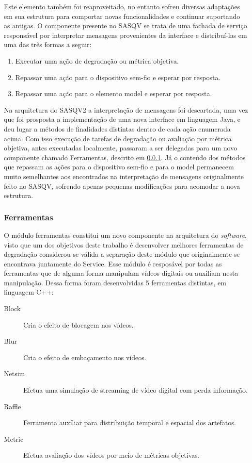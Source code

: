 Este elemento também foi reaproveitado, no entanto sofreu diversas adaptações em sua estrutura para comportar novas funcionalidades e continuar suportando as antigas.
O componente presente no SASQV se trata de uma fachada de serviço responsável por interpretar mensagens provenientes da interface e distribuí-las em uma das três formas a seguir:

\begin{enumerate}
	\item Executar uma ação de degradação ou métrica objetiva.
	\item Repassar uma ação para o dispositivo sem-fio e esperar por resposta.
	\item Repassar uma ação para o elemento model e esperar por resposta.
\end{enumerate}

Na arquitetura do SASQV2 a interpretação de mensagens foi descartada, uma vez que foi prosposta a implementação de uma nova interface em linguagem Java, e deu lugar a métodos de finalidades distintas dentro de cada ação enumerada acima. %
Com isso execução de tarefas de degradação ou avaliação por métrica objetiva, antes executadas localmente, passaram a ser delegadas para um novo componente chamado Ferramentas, descrito em \ref{met:ferramentas}.
Já o conteúdo dos métodos que repassam as ações para o dispositivo sem-fio e para o model permanecem muito semelhantes aos encontrados na interpretação de mensagens originalmente feito no SASQV, sofrendo apenas pequenas modificações para acomodar a nova estrutura.

\subsubsection{Ferramentas}
\label{met:ferramentas}

O módulo ferramentas constitui um novo componente na arquitetura do \emph{software}, visto que um dos objetivos deste trabalho é desenvolver melhores ferramentas de degradação considerou-se válida a separação deste módulo que originalmente se encontrava juntamente do Service.
Esse módulo é resposável por todas as ferramentas que de alguma forma manipulam vídeos digitais ou auxilíam nesta manipulação. Dessa forma foram desenvolvidas 5 ferramentas distintas, em linguagem C++:

\begin{description}
	\item[Block] Cria o efeito de blocagem nos vídeos.
	\item[Blur] Cria o efeito de embaçamento nos vídeos.
	\item[Netsim] Efetua uma simulação de streaming de vídeo digital com perda informação.
	\item[Raffle] Ferramenta auxíliar para distribuição temporal e espacial dos artefatos.
	\item[Metric] Efetua avaliação dos vídeos por meio de métricas objetivas.
\end{description}


